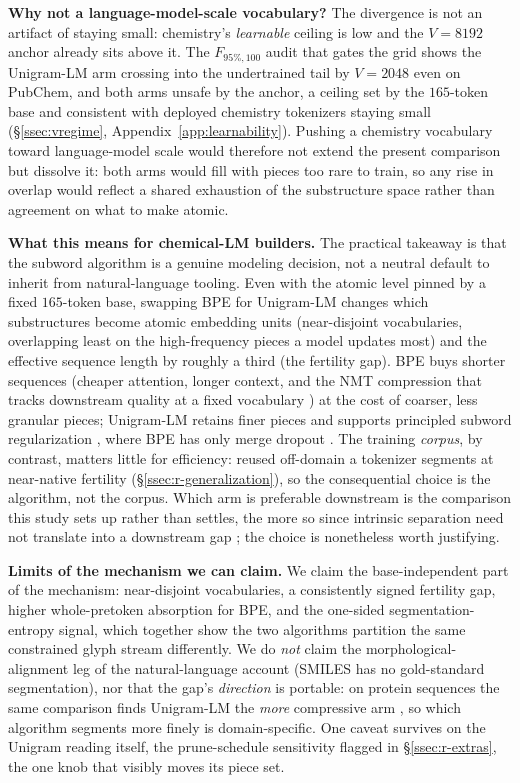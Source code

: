 \documentclass{article}
\begin{document}
\textbf{Why not a language-model-scale vocabulary?} The divergence is not an
artifact of staying small: chemistry's \emph{learnable} ceiling is low and the
$V{=}8192$ anchor already sits above it. The $F_{95\%,100}$ audit that gates the
grid shows the Unigram-LM arm crossing into the undertrained tail by $V{=}2048$
even on PubChem, and both arms unsafe by the anchor, a ceiling set by the
$165$-token base and consistent with deployed chemistry tokenizers staying small
(\S\ref{ssec:vregime}, Appendix~\ref{app:learnability}). Pushing a chemistry
vocabulary toward language-model scale would therefore not extend the present
comparison but dissolve it: both arms would fill with pieces too rare to train,
so any rise in overlap would reflect a shared exhaustion of the substructure
space rather than agreement on what to make atomic.

\textbf{What this means for chemical-LM builders.} The practical takeaway
is that the subword algorithm is a genuine modeling decision, not a neutral
default to inherit from natural-language tooling. Even with the atomic level
pinned by a fixed $165$-token base, swapping BPE for Unigram-LM changes which
substructures become atomic embedding units (near-disjoint vocabularies,
overlapping least on the high-frequency pieces a model updates most) and the
effective sequence length
by roughly a third (the fertility gap). BPE buys shorter sequences (cheaper
attention, longer context, and the NMT compression that tracks downstream
quality at a fixed vocabulary \citep{galle2019investigating}) at the cost of
coarser, less granular pieces; Unigram-LM retains finer pieces and supports
principled subword regularization \citep{kudo2018subword-reg}, where BPE has only
merge dropout \citep{provilkov2020bpe-dropout}. The training \emph{corpus}, by
contrast, matters little for efficiency: reused off-domain a tokenizer segments
at near-native fertility (\S\ref{ssec:r-generalization}), so the consequential
choice is the algorithm, not the corpus. Which arm is preferable downstream is
the comparison this study sets up rather than settles, the more so since
intrinsic separation need not translate into a downstream gap
\citep{ali2024tokenizer-choice}; the choice is nonetheless worth justifying.

\textbf{Limits of the mechanism we can claim.} We claim the
base-independent part of the mechanism: near-disjoint vocabularies, a
consistently signed fertility gap, higher whole-pretoken absorption for BPE, and
the one-sided segmentation-entropy signal, which together show the two algorithms
partition the same constrained glyph stream differently. We do \emph{not} claim
the morphological-alignment leg of the natural-language account (SMILES has no
gold-standard segmentation), nor that the gap's \emph{direction} is portable: on
protein sequences the same comparison finds Unigram-LM the \emph{more} compressive
arm \citep{suyunu2024linguistic}, so which algorithm segments more finely is
domain-specific. One caveat survives on the Unigram reading itself, the
prune-schedule sensitivity flagged in \S\ref{ssec:r-extras}, the one knob that
visibly moves its piece set.
\end{document}
